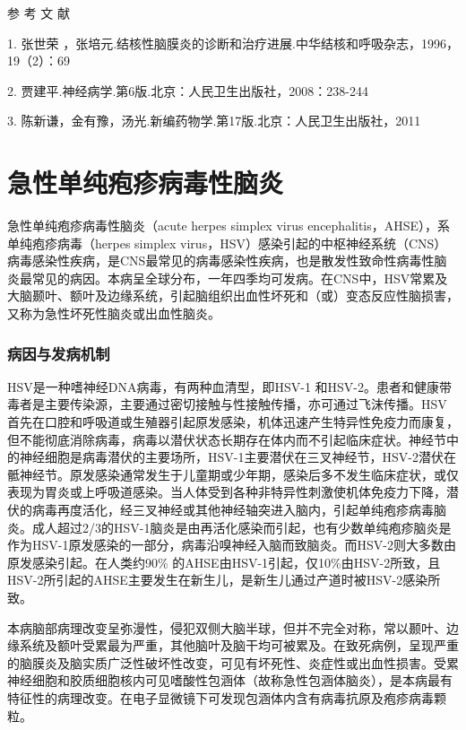\protect\hypertarget{text00251.html}{}{}

\hypertarget{text00251.htmlux5cux23CHP8-3-5}{}
参 考 文 献

1. 张世荣
，张培元.结核性脑膜炎的诊断和治疗进展.中华结核和呼吸杂志，1996，19（2）：69

2. 贾建平.神经病学.第6版.北京：人民卫生出版社，2008：238-244

3. 陈新谦，金有豫，汤光.新编药物学.第17版.北京：人民卫生出版社，2011

\protect\hypertarget{text00252.html}{}{}

\chapter{急性单纯疱疹病毒性脑炎}

急性单纯疱疹病毒性脑炎（acute herpes simplex virus
encephalitis，AHSE），系单纯疱疹病毒（herpes simplex
virus，HSV）感染引起的中枢神经系统（CNS）病毒感染性疾病，是CNS最常见的病毒感染性疾病，也是散发性致命性病毒性脑炎最常见的病因。本病呈全球分布，一年四季均可发病。在CNS中，HSV常累及大脑颞叶、额叶及边缘系统，引起脑组织出血性坏死和（或）变态反应性脑损害，又称为急性坏死性脑炎或出血性脑炎。

\subsection{病因与发病机制}

HSV是一种嗜神经DNA病毒，有两种血清型，即HSV-1
和HSV-2。患者和健康带毒者是主要传染源，主要通过密切接触与性接触传播，亦可通过飞沫传播。HSV首先在口腔和呼吸道或生殖器引起原发感染，机体迅速产生特异性免疫力而康复，但不能彻底消除病毒，病毒以潜伏状态长期存在体内而不引起临床症状。神经节中的神经细胞是病毒潜伏的主要场所，HSV-1主要潜伏在三叉神经节，HSV-2潜伏在骶神经节。原发感染通常发生于儿童期或少年期，感染后多不发生临床症状，或仅表现为胃炎或上呼吸道感染。当人体受到各种非特异性刺激使机体免疫力下降，潜伏的病毒再度活化，经三叉神经或其他神经轴突进入脑内，引起单纯疱疹病毒脑炎。成人超过2/3的HSV-1脑炎是由再活化感染而引起，也有少数单纯疱疹脑炎是作为HSV-1原发感染的一部分，病毒沿嗅神经入脑而致脑炎。而HSV-2则大多数由原发感染引起。在人类约90\%
的AHSE由HSV-1引起，仅10\%由HSV-2所致，且HSV-2所引起的AHSE主要发生在新生儿，是新生儿通过产道时被HSV-2感染所致。

本病脑部病理改变呈弥漫性，侵犯双侧大脑半球，但并不完全对称，常以颞叶、边缘系统及额叶受累最为严重，其他脑叶及脑干均可被累及。在致死病例，呈现严重的脑膜炎及脑实质广泛性破坏性改变，可见有坏死性、炎症性或出血性损害。受累神经细胞和胶质细胞核内可见嗜酸性包涵体（故称急性包涵体脑炎），是本病最有特征性的病理改变。在电子显微镜下可发现包涵体内含有病毒抗原及疱疹病毒颗粒。

